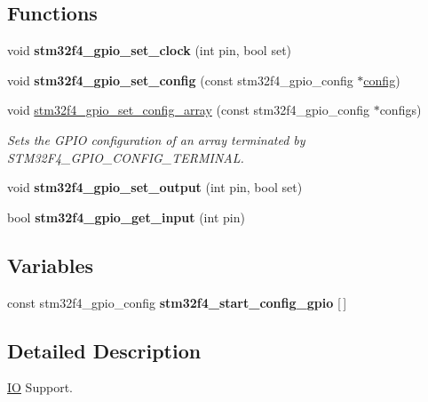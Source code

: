 \subsection*{Functions}
\begin{DoxyCompactItemize}
\item 
\mbox{\label{group__stm32f4__io_gaca9a1e509516fa23513163a011c94c00}} 
void {\bfseries stm32f4\+\_\+gpio\+\_\+set\+\_\+clock} (int pin, bool set)
\item 
\mbox{\label{group__stm32f4__io_ga1338a9cac091aad265392481d5126a07}} 
void {\bfseries stm32f4\+\_\+gpio\+\_\+set\+\_\+config} (const stm32f4\+\_\+gpio\+\_\+config $\ast$\mbox{\hyperlink{structconfig__s}{config}})
\item 
\mbox{\label{group__stm32f4__io_gae49816ecfcd698a5c6ec1d6722062ad0}} 
void \mbox{\hyperlink{group__stm32f4__io_gae49816ecfcd698a5c6ec1d6722062ad0}{stm32f4\+\_\+gpio\+\_\+set\+\_\+config\+\_\+array}} (const stm32f4\+\_\+gpio\+\_\+config $\ast$configs)
\begin{DoxyCompactList}\small\item\em Sets the G\+P\+IO configuration of an array terminated by S\+T\+M32\+F4\+\_\+\+G\+P\+I\+O\+\_\+\+C\+O\+N\+F\+I\+G\+\_\+\+T\+E\+R\+M\+I\+N\+AL. \end{DoxyCompactList}\item 
\mbox{\label{group__stm32f4__io_ga6eae3016673623d4fbc7c0fabd1bb8a5}} 
void {\bfseries stm32f4\+\_\+gpio\+\_\+set\+\_\+output} (int pin, bool set)
\item 
\mbox{\label{group__stm32f4__io_gabcb2779e78f1d055e11a9e146092d279}} 
bool {\bfseries stm32f4\+\_\+gpio\+\_\+get\+\_\+input} (int pin)
\end{DoxyCompactItemize}
\subsection*{Variables}
\begin{DoxyCompactItemize}
\item 
\mbox{\label{group__stm32f4__io_ga21a92896b815b82ae825c3f3d5f51503}} 
const stm32f4\+\_\+gpio\+\_\+config {\bfseries stm32f4\+\_\+start\+\_\+config\+\_\+gpio} \mbox{[}$\,$\mbox{]}
\end{DoxyCompactItemize}


\subsection{Detailed Description}
\mbox{\hyperlink{structIO}{IO}} Support. 

